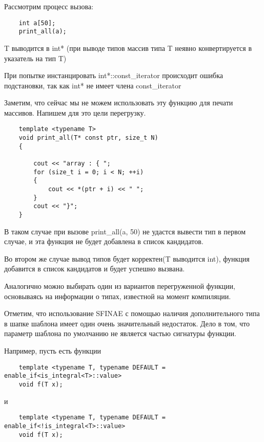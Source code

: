 	Рассмотрим процесс вызова:
	
	\begin{verbatim}
	int a[50];
	print_all(a);
	\end{verbatim}
	
	T выводится в int* (при выводе типов массив типа T неявно конвертируется в указатель на тип T)
	
	При попытке инстанцировать int*::const\_iterator происходит ошибка подстановки, так как int* не имеет члена const\_iterator 
	
	Заметим, что сейчас мы не можем использовать эту функцию для печати массивов. Напишем для это цели перегрузку.
	
	\begin{verbatim}
	template <typename T>
	void print_all(T* const ptr, size_t N)
	{

	    cout << "array : { ";
	    for (size_t i = 0; i < N; ++i)
	    {
	        cout << *(ptr + i) << " ";
	    } 
	    cout << "}";
	}
	\end{verbatim}	

	В таком случае при вызове print\_all(a, 50) не удастся вывести тип в первом случае, и эта функция не будет добавлена в список кандидатов.
	
	Во втором же случае вывод типов будет корректен(T выводится int), функция добавится в список кандидатов и будет успешно вызвана.
	
	Аналогично можно выбирать один из вариантов перегруженной функции, основываясь на информации о типах, известной на момент компиляции.

	\vspace{\baselineskip}
	
	Отметим, что использование SFINAE с помощью наличия дополнительного типа в шапке шаблона имеет один очень значительный недостаток. Дело в том, что параметр шаблона по умолчанию не является частью сигнатуры функции.

	Например, пусть есть функции

	\begin{verbatim}
	template <typename T, typename DEFAULT = enable_if<is_integral<T>::value>
	void f(T x);
	\end{verbatim}
	
	и
	
	\begin{verbatim}
	template <typename T, typename DEFAULT = enable_if<!is_integral<T>::value>
	void f(T x);
	\end{verbatim}
	
